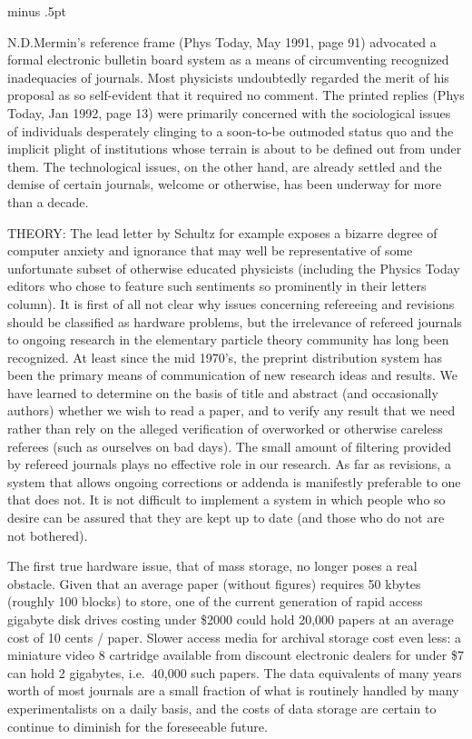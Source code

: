
\baselineskip14pt minus .5pt


\bigskip

N.D.Mermin's reference frame (Phys Today, May 1991, page 91) advocated a
formal electronic bulletin board system as a means of circumventing recognized
inadequacies of journals. Most physicists undoubtedly regarded the merit of  
his proposal as so self-evident that it required no comment. The printed
replies (Phys Today, Jan 1992, page 13) were primarily concerned with the
sociological issues of individuals desperately clinging to a soon-to-be
outmoded status quo and the implicit plight of institutions whose terrain
is about to be defined out from under them. The technological issues, on
the other hand, are already settled and the demise of certain journals,
welcome or otherwise, has been underway for more than a decade.

THEORY:\hfill\break
The lead letter by Schultz for example exposes a bizarre degree of
computer anxiety and ignorance that may well be representative of some
unfortunate subset of otherwise educated physicists (including the Physics
Today editors who chose to feature such sentiments so prominently in their
letters column). It is first of all not clear why issues concerning
refereeing and revisions should be classified as hardware problems, but
the irrelevance of refereed journals to ongoing research in the elementary
particle theory community has long been recognized. At least since the mid
1970's, the preprint distribution system has been the primary means of
communication of new research ideas and results. We have learned to
determine on the basis of title and abstract (and occasionally authors)
whether we wish to read a paper, and to verify any result that we need
rather than rely on the alleged verification of overworked or otherwise
careless referees (such as ourselves on bad days). The small amount of
filtering provided by refereed journals plays no effective role in our
research. As far as revisions, a system that allows ongoing corrections or
addenda is manifestly preferable to one that does not. It is not difficult
to implement a system in which people who so desire can be assured that
they are kept up to date (and those who do not are not bothered).

The first true hardware issue, that of mass storage, no longer poses a real
obstacle. Given that an average paper (without figures) requires 50 kbytes
(roughly 100 blocks) to store, one of the current generation of rapid
access gigabyte disk drives costing under \$2000 could hold 20,000 papers at
an average cost of 10 cents / paper. Slower access media for archival
storage cost even less: a miniature video 8 cartridge available from
discount electronic dealers for under \$7 can hold 2 gigabytes, i.e.\ 40,000
such papers. The data equivalents of many years worth of most journals are
a small fraction of what is routinely handled by many experimentalists on a
daily basis, and the costs of data storage are certain to continue to
diminish for the foreseeable future.

